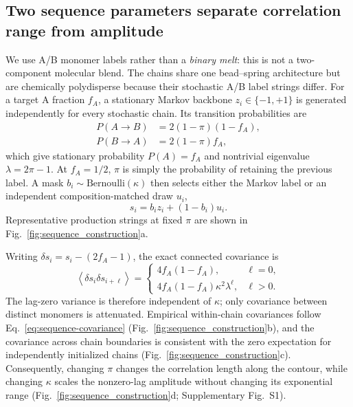 \documentclass[pdflatex,sn-nature,onecolumn]{sn-jnl}
\begin{document}
\subsection{Two sequence parameters separate correlation range from amplitude}

We use A/B monomer labels rather than a \emph{binary melt}: this is not a two-component molecular blend. The chains share one bead--spring architecture but are chemically polydisperse because their stochastic A/B label strings differ. For a target A fraction $f_A$, a stationary Markov backbone $z_i\in\{-1,+1\}$ is generated independently for every stochastic chain. Its transition probabilities are
\begin{align}
P(A\rightarrow B)&=2(1-\pi)(1-f_A),\\
P(B\rightarrow A)&=2(1-\pi)f_A,
\end{align}
which give stationary probability $P(A)=f_A$ and nontrivial eigenvalue $\lambda=2\pi-1$. At $f_A=1/2$, $\pi$ is simply the probability of retaining the previous label. A mask $b_i\sim\mathrm{Bernoulli}(\kappa)$ then selects either the Markov label or an independent composition-matched draw $u_i$,
\begin{equation}
s_i=b_i z_i+(1-b_i)u_i .
\label{eq:two-stage}
\end{equation}
Representative production strings at fixed $\pi$ are shown in Fig.~\ref{fig:sequence_construction}a.

Writing $\delta s_i=s_i-(2f_A-1)$, the exact connected covariance is
\begin{equation}
\left\langle\delta s_i\delta s_{i+\ell}\right\rangle=
\begin{cases}
4f_A(1-f_A), & \ell=0,\\
4f_A(1-f_A)\kappa^2\lambda^{\ell}, & \ell>0.
\end{cases}
\label{eq:sequence-covariance}
\end{equation}
The lag-zero variance is therefore independent of $\kappa$; only covariance between distinct monomers is attenuated. Empirical within-chain covariances follow Eq.~\ref{eq:sequence-covariance} (Fig.~\ref{fig:sequence_construction}b), and the covariance across chain boundaries is consistent with the zero expectation for independently initialized chains (Fig.~\ref{fig:sequence_construction}c). Consequently, changing $\pi$ changes the correlation length along the contour, while changing $\kappa$ scales the nonzero-lag amplitude without changing its exponential range (Fig.~\ref{fig:sequence_construction}d; Supplementary Fig.~S1).
\end{document}
